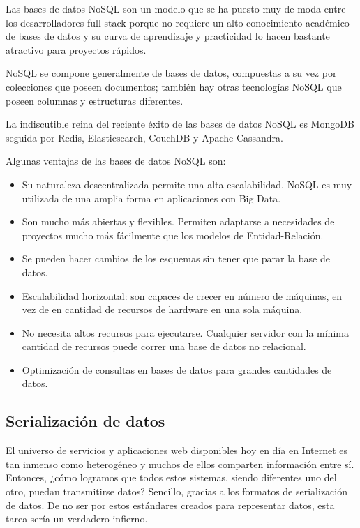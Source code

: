 Las bases de datos NoSQL son un modelo que se ha puesto muy de moda entre los desarrolladores full-stack porque no requiere un alto conocimiento académico de bases de datos y su curva de aprendizaje y practicidad lo hacen bastante atractivo para proyectos rápidos.

NoSQL se compone generalmente de bases de datos, compuestas a su vez por colecciones que poseen documentos; también hay otras tecnologías NoSQL que poseen columnas y estructuras diferentes.

La indiscutible reina del reciente éxito de las bases de datos NoSQL es MongoDB seguida por Redis, Elasticsearch, CouchDB y Apache Cassandra.

Algunas ventajas de las bases de datos NoSQL son:

\begin{itemize}
  \item Su naturaleza descentralizada permite una alta escalabilidad. NoSQL es muy utilizada de una amplia forma en aplicaciones con Big Data.
  \item Son mucho más abiertas y flexibles. Permiten adaptarse a necesidades de proyectos mucho más fácilmente que los modelos de Entidad-Relación.
  \item Se pueden hacer cambios de los esquemas sin tener que parar la base de datos.
  \item Escalabilidad horizontal: son capaces de crecer en número de máquinas, en vez de en cantidad de recursos de hardware en una sola máquina.
  \item No necesita altos recursos para ejecutarse. Cualquier servidor con la mínima cantidad de recursos puede correr una base de datos no relacional.
  \item Optimización de consultas en bases de datos para grandes cantidades de datos.
\end{itemize}

\subsection{Serialización de datos}

El universo de servicios y aplicaciones web disponibles hoy en día en Internet es tan inmenso como heterogéneo y muchos de ellos comparten información entre sí. Entonces, ¿cómo logramos que todos estos sistemas, siendo diferentes uno del otro, puedan transmitirse datos? Sencillo, gracias a los formatos de serialización de datos. De no ser por estos estándares creados para representar datos, esta tarea sería un verdadero infierno.

